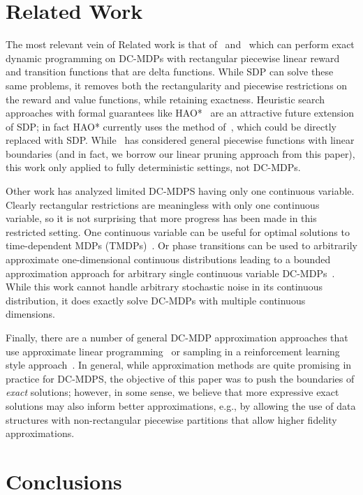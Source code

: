 \documentclass[letterpaper]{article}
\begin{document}
\section{Related Work}
The most relevant vein of Related work is that of~\cite{feng04}
and~\cite{li05} which can perform exact dynamic programming on
DC-MDPs with rectangular piecewise linear reward and transition functions
that are delta functions.  While SDP can solve these same problems,
it removes both the rectangularity and piecewise restrictions on the
reward and value functions, while
retaining exactness.  
Heuristic search approaches with formal guarantees 
like HAO*~\cite{hao09} are an attractive future extension of SDP;
in fact HAO* currently uses the method of~\cite{feng04}, which could
be directly replaced with SDP.  While~\cite{penberthy94} has considered
general piecewise functions with linear boundaries (and in fact,
we borrow our linear pruning approach from this paper), this work
only applied to fully deterministic settings, not DC-MDPs.

Other work has analyzed limited DC-MDPS having only one continuous
variable.  Clearly rectangular restrictions are meaningless with
only one continuous variable, so it is not surprising that more
progress has been made in this restricted setting.  One continuous
variable can be useful for optimal solutions to time-dependent MDPs 
(TMDPs)~\cite{boyan01}.  Or phase transitions can be used to 
arbitrarily approximate one-dimensional continuous distributions
leading to a bounded approximation approach for arbitrary single continuous
variable DC-MDPs~\cite{phase07}.  
While this work cannot handle arbitrary stochastic
noise in its continuous distribution, it does exactly solve DC-MDPs
with multiple continuous dimensions.

Finally, there are a number of general DC-MDP approximation
approaches that use approximate linear programming~\cite{kveton06}
or sampling in a reinforcement learning style approach~\cite{munos02}.
In general, while approximation methods are quite promising in
practice for DC-MDPS, the objective of this paper was to push
the boundaries of \emph{exact} solutions; however, in some sense, 
we believe that more expressive exact solutions may also inform
better approximations, e.g., by allowing the use of data structures
with non-rectangular piecewise partitions that allow higher fidelity
approximations.

\section{Conclusions}




\end{document}
